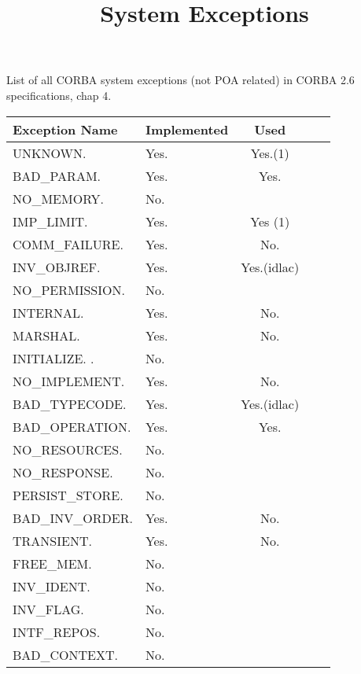 \documentclass[a4paper,10pt]{article}
\title{System Exceptions}
\author{}
\begin{document}
\maketitle

List of all CORBA system exceptions (not POA related) in CORBA 2.6
specifications, chap 4.\\

\begin{center}
\begin {tabular}{|l|l|c|c|c|}
\hline
\textbf{Exception Name}&\textbf{Implemented}&\textbf{Used}\\
\hline
\hline
UNKNOWN.                   & Yes. & Yes.(1)\\
BAD\_PARAM.                & Yes. & Yes.   \\
NO\_MEMORY.                & No.  &        \\
IMP\_LIMIT.                & Yes. & Yes (1)\\
COMM\_FAILURE.             & Yes. & No.    \\
INV\_OBJREF.               & Yes. & Yes.(idlac)    \\
NO\_PERMISSION.            & No.  &        \\
INTERNAL.                  & Yes. & No.    \\
MARSHAL.                   & Yes. & No.    \\
INITIALIZE. .              & No.  &        \\
NO\_IMPLEMENT.             & Yes. & No.    \\
BAD\_TYPECODE.             & Yes. & Yes.(idlac)    \\
BAD\_OPERATION.            & Yes. & Yes.   \\
NO\_RESOURCES.             & No.  &        \\
NO\_RESPONSE.              & No.  &        \\
PERSIST\_STORE.            & No.  &        \\
BAD\_INV\_ORDER.           & Yes. & No.    \\
TRANSIENT.                 & Yes. & No.    \\
FREE\_MEM.                 & No.  &        \\
INV\_IDENT.                & No.  &        \\
INV\_FLAG.                 & No.  &        \\
INTF\_REPOS.               & No.  &        \\
BAD\_CONTEXT.              & No.  &        \\

\end{tabular}
\end{center}
\end{document}
